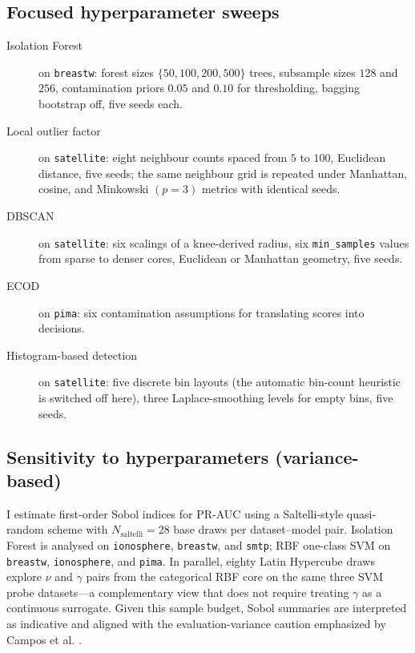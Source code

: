 \documentclass[cameraready]{Interspeech}
\begin{document}
\subsection{Focused hyperparameter sweeps}

\begin{description}
    \item[Isolation Forest] on \texttt{breastw}: forest sizes \(\{50,100,200,500\}\) trees, subsample sizes \(128\) and \(256\), contamination priors \(0.05\) and \(0.10\) for thresholding, bagging bootstrap off, five seeds each.

    \item[Local outlier factor] on \texttt{satellite}: eight neighbour counts spaced from \(5\) to \(100\), Euclidean distance, five seeds; the same neighbour grid is repeated under Manhattan, cosine, and Minkowski \((p{=}3)\) metrics with identical seeds.

    \item[DBSCAN] on \texttt{satellite}: six scalings of a knee-derived radius, six \texttt{min\_samples} values from sparse to denser cores, Euclidean or Manhattan geometry, five seeds.

    \item[ECOD] on \texttt{pima}: six contamination assumptions for translating scores into decisions.

    \item[Histogram-based detection] on \texttt{satellite}: five discrete bin layouts (the automatic bin-count heuristic is switched off here), three Laplace-smoothing levels for empty bins, five seeds.
\end{description}

\subsection{Sensitivity to hyperparameters (variance-based)}

I estimate first-order Sobol indices for PR-AUC using a Saltelli-style quasi-random scheme with \(N_{\text{saltelli}}=28\) base draws per dataset--model pair. Isolation Forest is analysed on \texttt{ionosphere}, \texttt{breastw}, and \texttt{smtp}; RBF one-class SVM on \texttt{breastw}, \texttt{ionosphere}, and \texttt{pima}. In parallel, eighty Latin Hypercube draws explore \(\nu\) and \(\gamma\) pairs from the categorical RBF core on the same three SVM probe datasets---a complementary view that does not require treating \(\gamma\) as a continuous surrogate. Given this sample budget, Sobol summaries are interpreted as indicative and aligned with the evaluation-variance caution emphasized by Campos et al. \cite{campos2016evaluation}.
\end{document}
